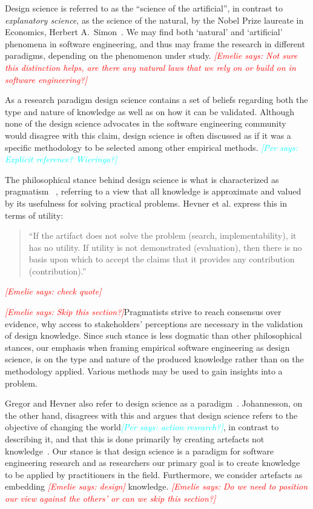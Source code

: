 \documentclass[graybox]{svmult}
\newcommand{\emelie}[1]{\textcolor{red}{{\it [Emelie says: #1]}}}
\newcommand{\per}[1]{\textcolor{cyan}{{\it [Per says: #1]}}}
\newcommand{\emelie}[1]{}
\newcommand{\per}[1]{}
\begin{document}
Design science is referred to as the ``science of the artificial'', in contrast to \emph{explanatory science}, as the science of the natural, by the Nobel Prize laureate in Economics, Herbert A.\ Simon~\cite{Simons69}. We may find both `natural' and `artificial' phenomena in software engineering, and thus may frame the research in different paradigms, depending on the phenomenon under study. \emelie{Not sure this distinction helps, are there any natural laws that we rely on or build on in software engineering?}

As a research paradigm design science contains a set of beliefs regarding both the type and nature of knowledge as well as on how it can be validated. Although none of the design science advocates in the software engineering community would disagree with this claim, design science is often discussed as if it was a specific methodology to be selected among other empirical methods. \per{Explicit reference? Wieringa?}

The philosophical stance behind design science is what is characterized as pragmatism~\cite{easterbrook_selecting_2008}%
, referring to a view that all knowledge is approximate and valued by its usefulness for solving practical problems. Hevner et al. express this in terms of utility: 

\begin{quote}
	``If the artifact does not solve the problem (search, implementability), it has no utility. If utility is not demonstrated (evaluation), then there is no basis upon which to accept the claims that it provides any contribution (contribution).''~\cite{hevner_design_2004}
\end{quote}\emelie{check quote} 

\emelie{Skip this section?}Pragmatists strive to reach consensus over evidence, why access to stakeholders' perceptions are necessary in the validation of design knowledge. Since such stance is less dogmatic than other philosophical stances, our emphasis when framing empirical software engineering as design science, is on the type and nature of the produced knowledge rather than on the methodology applied. Various methods may be used to gain insights into a problem. 

Gregor and Hevner also refer to design science as a paradigm~\cite{gregor_positioning_2013}. Johannesson, on the other hand, disagrees with this and argues that design science refers to the objective of changing the world\per{action research?}, in contrast to describing it, and that this is done primarily by creating artefacts not knowledge~\cite{johannesson_introduction_2014}. Our stance is that design science is a paradigm for software engineering research and as researchers our primary goal is to create knowledge to be applied by practitioners in the field. Furthermore, we consider artefacts as embedding \emelie{design} knowledge. \emelie{Do we need to position our view against the others' or can we skip this section?}
\end{document}
